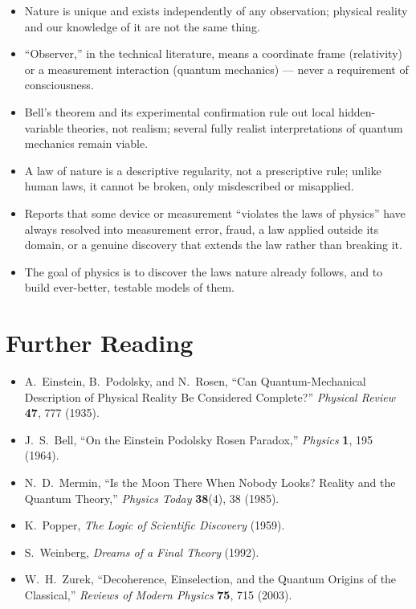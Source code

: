 \begin{itemize}
  \item Nature is unique and exists independently of any observation;
  physical reality and our knowledge of it are not the same thing.
  \item ``Observer,'' in the technical literature, means a coordinate frame
  (relativity) or a measurement interaction (quantum mechanics) --- never
  a requirement of consciousness.
  \item Bell's theorem and its experimental confirmation rule out local
  hidden-variable theories, not realism; several fully realist
  interpretations of quantum mechanics remain viable.
  \item A law of nature is a descriptive regularity, not a prescriptive
  rule; unlike human laws, it cannot be broken, only misdescribed or
  misapplied.
  \item Reports that some device or measurement ``violates the laws of
  physics'' have always resolved into measurement error, fraud, a law
  applied outside its domain, or a genuine discovery that extends the law
  rather than breaking it.
  \item The goal of physics is to discover the laws nature already
  follows, and to build ever-better, testable models of them.
\end{itemize}

\section*{Further Reading}
\label{sec:reality-further-reading}

\begin{itemize}
  \item A.\ Einstein, B.\ Podolsky, and N.\ Rosen, ``Can
  Quantum-Mechanical Description of Physical Reality Be Considered
  Complete?'' \emph{Physical Review} \textbf{47}, 777 (1935).
  \item J.\ S.\ Bell, ``On the Einstein Podolsky Rosen Paradox,''
  \emph{Physics} \textbf{1}, 195 (1964).
  \item N.\ D.\ Mermin, ``Is the Moon There When Nobody Looks? Reality
  and the Quantum Theory,'' \emph{Physics Today} \textbf{38}(4), 38
  (1985).
  \item K.\ Popper, \emph{The Logic of Scientific Discovery} (1959).
  \item S.\ Weinberg, \emph{Dreams of a Final Theory} (1992).
  \item W.\ H.\ Zurek, ``Decoherence, Einselection, and the Quantum
  Origins of the Classical,'' \emph{Reviews of Modern Physics}
  \textbf{75}, 715 (2003).
\end{itemize}
